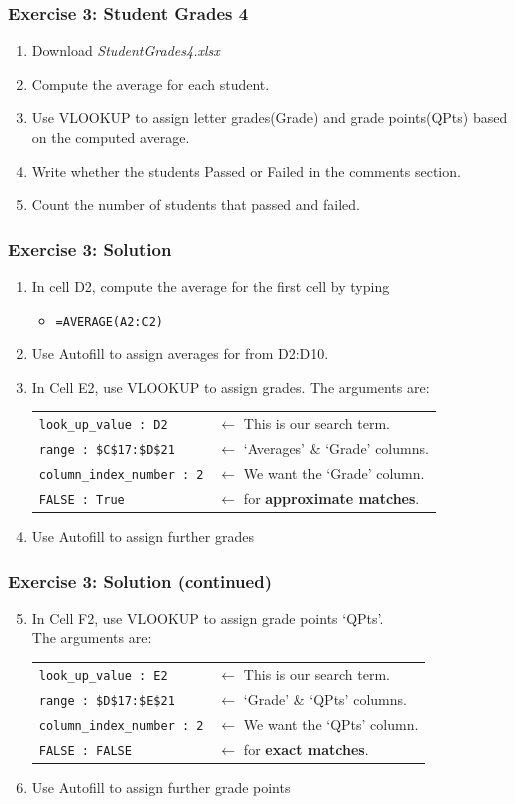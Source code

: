 \documentclass[12pt]{beamer}
\begin{document}
\begin{frame}
	\frametitle{Exercise 3: Student Grades 4}
	\begin{enumerate}
		\item Download \textit{StudentGrades4.xlsx}
		\item Compute the average for each student.
		\item Use VLOOKUP to assign letter grades(Grade) and grade points(QPts) based on the computed average.
		\item Write whether the students Passed or Failed in the comments section. 
		\item Count the number of students that passed and failed. 
	\end{enumerate}
\end{frame}
\begin{frame}
	\frametitle{Exercise 3: Solution}
	\begin{enumerate}
		\item In cell D2, compute the average for the first cell by typing
		\begin{itemize}
			\item  \texttt{=AVERAGE(A2:C2)}
		\end{itemize}
		\item Use Autofill to assign averages for from D2:D10.
		\item In Cell E2, use VLOOKUP to assign grades. The arguments are:
			\begin{tabular}{l l }
				\texttt{look\_up\_value : D2}& $\leftarrow$ This is our search term.\\
				\texttt{range : \$C\$17:\$D\$21}& $\leftarrow$ `Averages' \& `Grade' columns.\\
				\texttt{column\_index\_number : 2} &$\leftarrow$ We want the `Grade' column.\\
				\texttt{FALSE : True}& $\leftarrow$ for \textbf{approximate matches}.\\
			\end{tabular}
		\item Use Autofill to assign further grades
	\end{enumerate}
\end{frame}
\begin{frame}
	\frametitle{Exercise 3: Solution (continued)}
	\begin{enumerate}
		\setcounter{enumi}{4}
		\item In Cell F2, use VLOOKUP to assign grade points `QPts'.\\ The arguments are:
		\begin{tabular}{l l }
			\texttt{look\_up\_value : E2}& $\leftarrow$ This is our search term.\\
			\texttt{range : \$D\$17:\$E\$21}& $\leftarrow$ `Grade' \& `QPts' columns.\\
			\texttt{column\_index\_number : 2} &$\leftarrow$ We want the `QPts' column.\\
			\texttt{FALSE : FALSE}& $\leftarrow$ for \textbf{exact matches}.\\
		\end{tabular}
		\item Use Autofill to assign further grade points
	\end{enumerate}
\end{frame}
\end{document}
